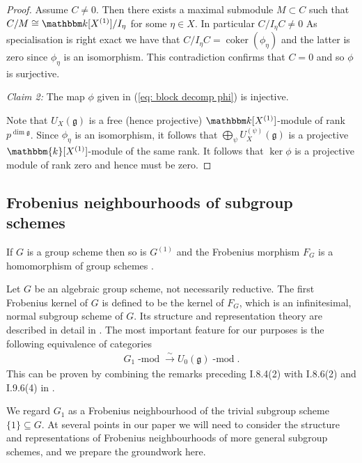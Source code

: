 \documentclass[twoside,12pt,reqno]{amsart}
\theoremstyle{remark}
\numberwithin{equation}{section}
\def\isoto{\overset{\sim}{\longrightarrow}}
\def\k{{\mathbbm k}}
\def\lmod{\!\operatorname{-mod}}
\def\coker{\operatorname{coker}}
\def\g{{\mathfrak g}}
\begin{document}
\begin{proof}
    Assume $C \neq 0$. Then there exists a maximal submodule $M \subset C$ such that $C / M \cong \k[X^{(1)}] / I_\eta$ for some $\eta \in X$. In particular $C / I_\eta C \ne 0$
    As specialisation is right exact we have that $C / I_\eta C = \coker(\phi_\eta)$ and the latter is zero since $\phi_\eta$ is an isomorphism. This contradiction confirms that $C = 0$ and so $\phi$ is surjective.


{\it Claim 2:} The map $\phi$ given in (\ref{eq: block decomp phi}) is injective.



    Note that $U_X(\g)$ is a free (hence projective) $\k[X^{(1)}]$-module of rank $p^{\dim \g}$.  Since $\phi_\eta$ is an isomorphism, it follows that $\bigoplus_\psi U_X^{(\psi)}(\g)$ is a projective $\mathbbm{k}[X^{(1)}]$-module of the same rank. It follows that $\ker \phi$ is a projective module of rank zero and hence must be zero.
\end{proof}





\subsection{Frobenius neighbourhoods of subgroup schemes}
 \label{ss:stabilisersoftwistedcharacters}

If $G$ is a group scheme then so is $G^{(1)}$ and the Frobenius morphism $F_G$ is a homomorphism of group schemes \cite[I.9]{JanRAGS}.

Let $G$ be an algebraic group scheme, not necessarily reductive. The first Frobenius kernel of $G$ is defined to be the kernel of $F_G$, which is an infinitesimal, normal subgroup scheme of $G$. Its structure and representation theory are described in detail in \cite[II.2 \& II.3]{JanRAGS}. The most important feature for our purposes is the following equivalence of categories
\begin{eqnarray}
    \label{eq:Frobeniuskernelandrestrictedenvelopingalgebra}
    G_1\lmod \isoto U_0(\g)\lmod.
\end{eqnarray}
This can be proven by combining the remarks preceding I.8.4(2) with I.8.6(2) and I.9.6(4) in \cite{JanRAGS}.

We regard $G_1$ as a Frobenius neighbourhood of the trivial subgroup scheme $\{1\} \subseteq G$. At several points in our paper we will need to consider the structure and representations of Frobenius neighbourhoods of more general subgroup schemes, and we prepare the groundwork here.
\end{document}
